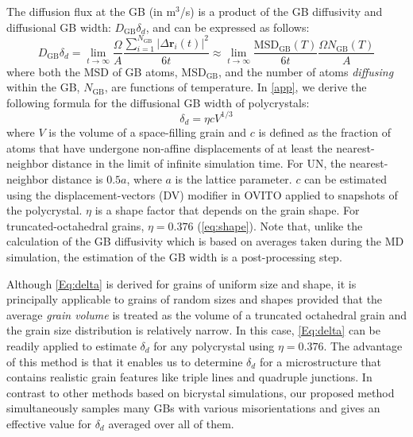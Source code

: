 \documentclass[preprint,12pt,sort&compress]{elsarticle}
\newcommand{\?}{\stackrel{?}{=}}
\begin{document}
The diffusion flux at the GB (in m$^3$/s) is a product of the GB diffusivity and diffusional GB width: $D_{\mathrm{GB}} \delta_d$, and can be expressed as follows:
\begin{equation}
D_{\mathrm{GB}} \delta_d = \lim_{t \rightarrow \infty} \frac{\Omega}{A} \frac{\sum_{i=1}^{N_{\mathrm{GB}}} |\Delta \mathbf{r}_i(t)|^2}{6t} \approx \lim_{t \rightarrow \infty} \frac{\mathrm{MSD}_{\mathrm{GB}}(T)}{6t} \frac{\Omega N_{\mathrm{GB}}(T) }{A}
\label{Eq:GBDiffFlux}
\end{equation}
where both the MSD of GB atoms, MSD${_{\text{GB}}}$, and the number of atoms \textit{diffusing} within the GB, $N_{\mathrm{GB}}$, are functions of temperature. In \ref{app}, we derive the following formula for the diffusional GB width of polycrystals:
\begin{equation}
\delta_d = \eta c V^{1/3}
\label{Eq:delta}
\end{equation}
where $V$ is the volume of a space-filling grain and $c$ is defined as the fraction of atoms that have undergone non-affine displacements of at least the nearest-neighbor distance in the limit of infinite simulation time. For UN, the nearest-neighbor distance is $0.5a$, where $a$ is the lattice parameter. $c$ can be estimated using the displacement-vectors (DV) modifier in OVITO \cite{Stukowski2010} applied to snapshots of the polycrystal. $\eta$ is a shape factor that depends on the grain shape. For truncated-octahedral grains, $\eta = 0.376$ (\cref{eq:shape}). Note that, unlike the calculation of the GB diffusivity which is based on averages taken during the MD simulation, the estimation of the GB width is a post-processing step.

Although \cref{Eq:delta} is derived for grains of uniform size and shape, it is principally applicable to grains of random sizes and shapes provided that the average \textit{grain volume} is treated as the volume of a truncated octahedral grain and the grain size distribution is relatively narrow. In this case, \cref{Eq:delta} can be readily applied to estimate $\delta_d$ for any polycrystal using $\eta = 0.376$. The advantage of this method is that it enables us to determine $\delta_d$ for a microstructure that contains realistic grain features like triple lines and quadruple junctions. In contrast to other methods based on bicrystal simulations, our proposed method simultaneously samples many GBs with various misorientations and gives an effective value for $\delta_d$ averaged over all of them.
\end{document}
